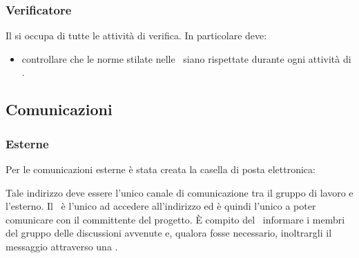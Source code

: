 \documentclass[../NormeDiProgetto.tex]{subfiles}
\begin{document}
			\subsubsection{Verificatore}
				Il \verificatore si occupa di tutte le attività di verifica.
				In particolare deve:
				\begin{itemize}
					\item controllare che le norme stilate nelle \normediprogetto\ siano rispettate durante ogni attività di .
				\end{itemize}
		\subsection{Comunicazioni}
			\subsubsection{Esterne}
				Per le comunicazioni esterne è stata creata la casella di posta
				elettronica:
				\begin{center}
					\mailkaleidoscode
				\end{center}
				Tale indirizzo deve essere l'unico canale di comunicazione tra il
				gruppo di lavoro e l'esterno.
				Il \responsabilediprogetto\ è l'unico ad accedere
				all'indirizzo ed è quindi l'unico a poter comunicare con il
				committente del progetto. È compito del \responsabilediprogetto\ informare
				i membri del gruppo delle discussioni avvenute e,
				qualora fosse necessario, inoltrargli il messaggio attraverso
				una .
\end{document}
